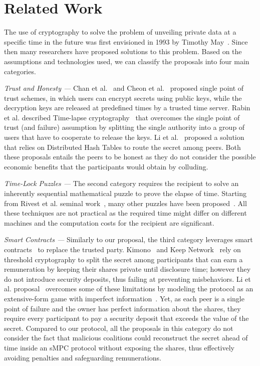 \section{Related Work}\label{sect:relwork}

The use of cryptography to solve the problem of unveiling private data at a specific time in the future was first envisioned in 1993 by Timothy May~\cite{may1993timed}. Since then many researchers have proposed solutions to this problem.
%
Based on the assumptions and technologies used, we can classify the proposals into four main categories.

{\em Trust and Honesty ---} Chan et al.~\cite{1437112} and Cheon et al.~\cite{10.1007/11889663_17} proposed single point of trust schemes, in which users can encrypt secrets using public keys, while the decryption keys are released at predefined times by a trusted time server.
%
Rabin et al. described Time-lapse cryptography~\cite{rabin2006time,PARKES2008294} that overcomes the single point of trust (and failure) assumption by splitting the single authority into a group of users that have to cooperate to release the keys. Li et al.~\cite{dht} proposed a solution that relies on Distributed Hash Tables to route the secret among peers. Both these proposals entails the peers to be honest as they do not consider the possible economic benefits that the participants would obtain by colluding.

{\em Time-Lock Puzzles ---} The second category requires the recipient to solve an inherently sequential mathematical puzzle to prove the elapse of time. Starting from Rivest et al. seminal work~\cite{Rivest:1996:TPT:888615}, many other puzzles have been proposed~\cite{Bitansky:2016:TPR:2840728.2840745,cohen2018,mahmoody-tl}. All these techniques are not practical as the required time might differ on different machines and the computation costs for the recipient are significant.

{\em Smart Contracts ---} Similarly to our proposal, the third category leverages smart contracts~\cite{szabo1997formalizing} to replace the trusted party. Kimono~\cite{kimono,kimono-network} and Keep Network~\cite{keep} rely on threshold cryptography to split the secret among participants that can earn a remuneration by keeping their shares private until disclosure time; however they do not introduce security deposits, thus failing at preventing misbehaviors.
%
Li et al. proposal~\cite{self-emerging1} overcomes some of these limitations by modeling the protocol as an extensive-form game with imperfect information~\cite{leyton2008essentials}. Yet, as each peer is a single point of failure and the owner has perfect information about the shares, they require every participant to pay a security deposit that exceeds the value of the secret.
%
Compared to our protocol, all the proposals in this category do not consider the fact that malicious coalitions could reconstruct the secret ahead of time inside an sMPC protocol without exposing the shares, thus effectively avoiding penalties and safeguarding remunerations.

